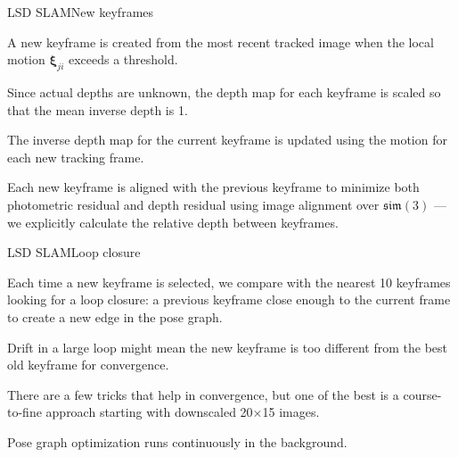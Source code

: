 \documentclass[aspectratio=169]{beamer}
\renewcommand{\vec}[1]{\boldsymbol{#1}}
\newcommand{\lsim}{\mathfrak{sim}}
\newcommand{\myfig}[3]{\centerline{\texttt{[image: \#2]}}
    \centerline{\scriptsize \begin{minipage}{#1} \centering #3 \end{minipage}}}
\begin{document}
\begin{frame}{LSD SLAM}{New keyframes}

  A new keyframe is created from the most recent tracked image when
  the local motion $\vec{\xi}_{ji}$ exceeds a threshold.

  \medskip

  Since actual depths are unknown, the depth map for each keyframe is
  scaled so that the mean inverse depth is 1.

  \medskip

  The inverse depth map for the current keyframe is updated using the
  motion for each new tracking frame.

  \medskip

  Each new keyframe is aligned with the previous keyframe to minimize
  both photometric residual and depth residual using image
  alignment over $\lsim(3)$ --- we explicitly calculate the
  \alert{relative depth} between keyframes.

\end{frame}




\begin{frame}{LSD SLAM}{Loop closure}

  Each time a new keyframe is selected, we compare with the nearest 10
  keyframes looking for a \alert{loop closure}: a previous keyframe
  close enough to the current frame to create a new edge in the pose
  graph.

  \medskip

  Drift in a large loop might mean the new keyframe is too different
  from the best old keyframe for convergence.

  \medskip

  There are a few tricks that help in convergence, but one of the best
  is a \alert{course-to-fine} approach starting with downscaled 20$\times$15
  images.

  \medskip

  \alert{Pose graph optimization} runs continuously in the background.
  
\end{frame}


\end{document}
